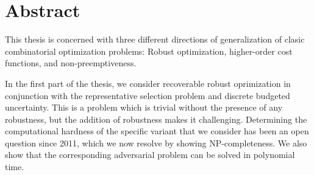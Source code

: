 \documentclass[twoside,openright,bibliography=totoc]{scrreprt}
\begin{document}











\printthesistitle

\printaffidavit



\chapter*{Abstract}
This thesis is concerned with three different directions of generalization of clasic combinatorial optimization problems: Robust optimization, higher-order cost functions, and non-preemptiveness.

In the first part of the thesis, we consider recoverable robust oprimization in conjunction with the representative selection problem and discrete budgeted uncertainty. 
This is a problem which is trivial without the presence of any robustness, but the addition of robustness makes it challenging. 
Determining the computational hardness of the specific variant that we consider has been an open question since 2011, which we now resolve by showing NP-completeness. We also show that the corresponding adversarial problem can be solved in polynomial time.
\end{document}

